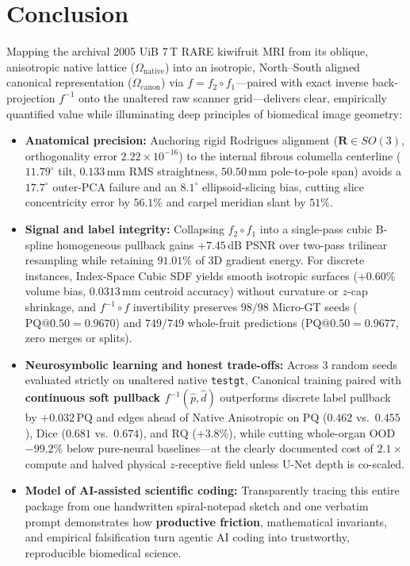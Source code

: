 \documentclass[10pt,a4paper]{article}
\renewcommand{\_}{\origunderscore\allowbreak}
\begin{document}
\clearpage
\section{Conclusion}
\label{sec:conclusion}

Mapping the archival 2005 UiB 7\,T RARE kiwifruit MRI from its oblique, anisotropic native lattice ($\Omega_{\text{native}}$) into an isotropic, North--South aligned canonical representation ($\Omega_{\text{canon}}$) via $f = f_2 \circ f_1$---paired with exact inverse back-projection $f^{-1}$ onto the unaltered raw scanner grid---delivers clear, empirically quantified value while illuminating deep principles of biomedical image geometry:

\begin{itemize}
    \item \textbf{Anatomical precision:} Anchoring rigid Rodrigues alignment ($\mathbf{R}\in SO(3)$, orthogonality error $2.22\times 10^{-16}$) to the internal fibrous columella centerline ($11.79^\circ$ tilt, $0.133\,\text{mm}$ RMS straightness, $50.50\,\text{mm}$ pole-to-pole span) avoids a $17.7^\circ$ outer-PCA failure and an $8.1^\circ$ ellipsoid-slicing bias, cutting slice concentricity error by $56.1\%$ and carpel meridian slant by $51\%$.
    \item \textbf{Signal and label integrity:} Collapsing $f_2 \circ f_1$ into a single-pass cubic B-spline homogeneous pullback gains $+7.45\,\text{dB}$ PSNR over two-pass trilinear resampling while retaining $91.01\%$ of 3D gradient energy. For discrete instances, Index-Space Cubic SDF yields smooth isotropic surfaces ($+0.60\%$ volume bias, $0.0313\,\text{mm}$ centroid accuracy) without curvature or $z$-cap shrinkage, and $f^{-1}\circ f$ invertibility preserves $98/98$ Micro-GT seeds ($\text{PQ@0.50} = 0.9670$) and $749/749$ whole-fruit predictions ($\text{PQ@0.50} = 0.9677$, zero merges or splits).
    \item \textbf{Neurosymbolic learning and honest trade-offs:} Across $3$ random seeds evaluated strictly on unaltered native \texttt{test\_gt}, Canonical training paired with \textbf{continuous soft pullback $f^{-1}(\hat{p},\hat{d})$} outperforms discrete label pullback by $+0.032\,\text{PQ}$ and edges ahead of Native Anisotropic on $\text{PQ}$ ($0.462$ vs.\ $0.455$), $\text{Dice}$ ($0.681$ vs.\ $0.674$), and $\text{RQ}$ ($+3.8\%$), while cutting whole-organ OOD $-99.2\%$ below pure-neural baselines---at the clearly documented cost of $2.1\times$ compute and halved physical $z$-receptive field unless U-Net depth is co-scaled.
    \item \textbf{Model of AI-assisted scientific coding:} Transparently tracing this entire package from one handwritten spiral-notepad sketch and one verbatim prompt demonstrates how \textbf{productive friction}, mathematical invariants, and empirical falsification turn agentic AI coding into trustworthy, reproducible biomedical science.
\end{itemize}
\end{document}
